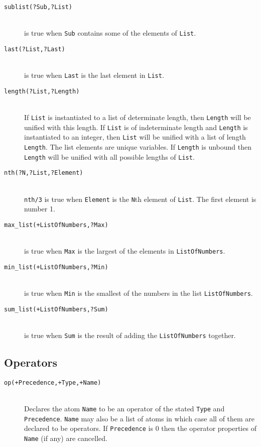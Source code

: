 \begin{description}
\item [{\tt sublist(?Sub,?List)}]~\\
	is true when {\tt Sub} contains some of the elements of {\tt List}.

\item [{\tt last(?List,?Last)}]~\\
	is true when {\tt Last} is the last element in {\tt List}.

\item [{\tt length(?List,?Length)}]~\\
	If {\tt List} is instantiated to a list of determinate length,
	then {\tt Length} will be unified with this length.
	If {\tt List} is of indeterminate length and {\tt Length} is
	instantiated to an integer, then {\tt List} will be unified
	with a list of length {\tt Length}.  The list elements are unique
	variables.  
	If {\tt Length} is unbound then {\tt Length} will be unified
	with all possible lengths of {\tt List}. 

\item [{\tt nth(?N,?List,?Element)}]~\\
	{\tt nth/3} is true when {\tt Element} is the {\tt N}th
	element of {\tt List}. The first element is number 1.

\item [{\tt max\_list(+ListOfNumbers,?Max)}]~\\
	is true when {\tt Max} is the largest of the elements in
	{\tt ListOfNumbers}. 

\item [{\tt min\_list(+ListOfNumbers,?Min)}]~\\
	is true when {\tt Min} is the smallest of the numbers in the list
	{\tt ListOfNumbers}.

\item [{\tt sum\_list(+ListOfNumbers,?Sum)}]~\\
	is true when {\tt Sum} is the result of adding the
	{\tt ListOfNumbers} together.


\end{description}

\subsection{Operators}

\begin{description}

\item [{\tt op(+Precedence,+Type,+Name)}]~\\
	Declares the atom {\tt Name} to be an operator of the stated
	{\tt Type} and {\tt Precedence}.
	{\tt Name} may also be a list of atoms in which case all of them are
	declared to be operators.  If {\tt Precedence} is 0 then the
	operator properties of {\tt Name} (if any) are cancelled.

\end{description}




